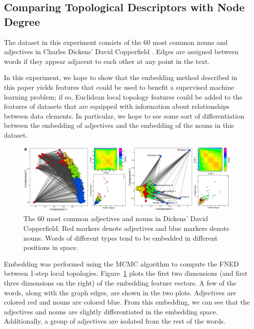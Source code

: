 \documentclass{article}
\begin{document}
\subsection{Comparing Topological Descriptors with Node Degree}

The dataset in this experiment consists of the 60 most common nouns and adjectives in Charles Dickens' David Copperfield \cite{newman2006finding}. Edges are assigned between words if they appear adjacent to each other at any point in the text.

In this experiment, we hope to show that the embedding method described in this paper yields features that could be used to benefit a supervised machine learning problem; if so, Euclidean local topology features could be added to the features of datasets that are equipped with information about relationships between data elements. In particular, we hope to see some sort of differentiation between the embedding of adjectives and the embedding of the nouns in this dataset.

\begin{figure}[h!tbp]
  \centering               
  \includegraphics[width=1\textwidth]{fig/fig5.pdf}
  \caption{The 60 most common adjectives and nouns in Dickens' David Copperfield. Red markers denote adjectives and blue markers denote nouns. Words of different types tend to be embedded in different positions in space.}
  \label{fig:dickensCopperfield}
\end{figure}

Embedding was performed using the MCMC algorithm to compute the FNED between 1-step local topologies. Figure~\ref{fig:dickensCopperfield} plots the first two dimensions (and first three dimensions on the right) of the embedding feature vectors. A few of the words, along with the graph edges, are shown in the two plots. Adjectives are colored red and nouns are colored blue. From this embedding, we can see that the adjectives and nouns are slightly differentiated in the embedding space. Additionally, a group of adjectives are isolated from the rest of the words.
\end{document}
